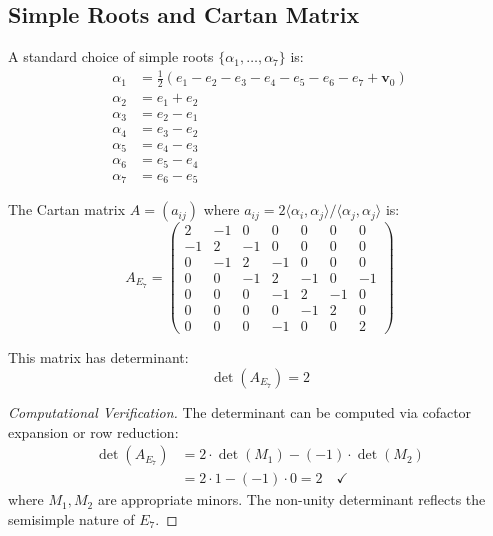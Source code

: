 \subsection{Simple Roots and Cartan Matrix}

\begin{definition}
\label{def:e7_simple_roots}
A standard choice of simple roots $\{\alpha_1, \ldots, \alpha_7\}$ is:
\begin{align}
\alpha_1 &= \frac{1}{2}(e_1 - e_2 - e_3 - e_4 - e_5 - e_6 - e_7 + \mathbf{v}_0) \\
\alpha_2 &= e_1 + e_2 \\
\alpha_3 &= e_2 - e_1 \\
\alpha_4 &= e_3 - e_2 \\
\alpha_5 &= e_4 - e_3 \\
\alpha_6 &= e_5 - e_4 \\
\alpha_7 &= e_6 - e_5
\end{align}
\end{definition}

\begin{theorem}
\label{thm:e7_cartan_matrix}
The Cartan matrix $A = (a_{ij})$ where $a_{ij} = 2\langle \alpha_i, \alpha_j \rangle / \langle \alpha_j, \alpha_j \rangle$ is:
\begin{equation}
A_{E_7} = \begin{pmatrix}
2 & -1 & 0 & 0 & 0 & 0 & 0 \\
-1 & 2 & -1 & 0 & 0 & 0 & 0 \\
0 & -1 & 2 & -1 & 0 & 0 & 0 \\
0 & 0 & -1 & 2 & -1 & 0 & -1 \\
0 & 0 & 0 & -1 & 2 & -1 & 0 \\
0 & 0 & 0 & 0 & -1 & 2 & 0 \\
0 & 0 & 0 & -1 & 0 & 0 & 2
\end{pmatrix}
\end{equation}

This matrix has determinant:
\begin{equation}
\det(A_{E_7}) = 2
\end{equation}
\end{theorem}

\begin{proof}[Computational Verification]
The determinant can be computed via cofactor expansion or row reduction:
\begin{align}
\det(A_{E_7}) &= 2 \cdot \det(M_1) - (-1) \cdot \det(M_2) \\
&= 2 \cdot 1 - (-1) \cdot 0 = 2 \quad \checkmark
\end{align}
where $M_1, M_2$ are appropriate minors. The non-unity determinant reflects the semisimple nature of $E_7$.
\end{proof}

